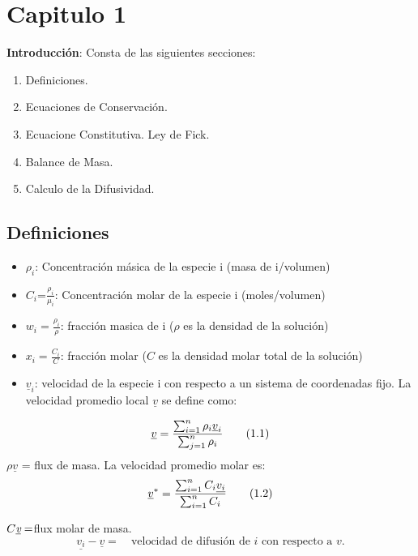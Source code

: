 \chapter{Capitulo 1}
\justifying
\textbf{Introducción}: Consta de las siguientes secciones:
 	\begin{enumerate}
 		 \item Definiciones. 
 		 \item Ecuaciones de Conservación.
 		  \item Ecuacione Constitutiva. Ley de Fick.
 		   \item Balance de Masa. 
 		   \item Calculo de la Difusividad. 
 	   \end{enumerate} 
 	   \section{Definiciones} 
 	   \begin{itemize}
 	  \item \emph{$\rho_i$}: Concentración másica de la especie i (masa de i/volumen)
 	  \item $C_i$=$\frac{\rho_i}{\mu_i}$: Concentración molar de la especie i (moles/volumen)
 	  \item $w_i=\frac{\rho_i}{\rho}$: fracción masica de i ($\rho$ es la densidad de la solución)
 	  \item $x_i=\frac{C_i}{C}$: fracción molar ($C$ es la densidad molar total de la solución)
 	  \item \emph{$ \underline{v}_i$}: velocidad de la especie i con respecto a un sistema de coordenadas fijo. La velocidad promedio local \emph{$ \underline{v}$} se define como:
 	 \end{itemize}
 	 \begin{equation}
 	 \emph{$ \underline{v}=\frac{\sum_{i=1}^n \rho_i  \underline{v}_i}{\sum_{j=1}^n \rho_i}$}
 	 \tag{1.1}
     \label{eq_1.1}
 	  \end{equation}
 	  \emph{$\rho  \underline{v}$} = flux de masa. La velocidad promedio molar es:
 	   \begin{equation}
 	  	\emph{$ \underline{v}^*=\frac{\sum_{i=1}^n C_i  \underline{v_i}}{\sum_{i=1}^n C_i}$}
 	  	\tag{1.2}
        \label{eq_1.2}
 	  \end{equation}
 	
$C\underline{\emph{v}}=$flux molar de masa.
 \begin{equation}
 \underline{	{v}_i} -\underline{{v} }=\quad \text{velocidad de difusión de $i$ con respecto a ${v}$}. \tag{1.3}
 \label{eq_1.3}
 \end{equation}
 
